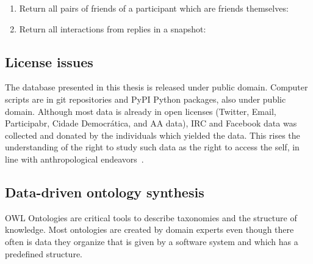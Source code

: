 \begin{enumerate}[leftmargin=0cm]
\item Return all pairs of friends of a participant which are friends themselves:\\
\item Return all interactions from replies in a snapshot:\\
\end{enumerate}

\subsection{License issues}
The database presented in this thesis is released under public domain.
Computer scripts are in git repositories and PyPI Python packages, also under public domain.
Although most data is already in open licenses (Twitter, Email, Participabr, Cidade Democrática, and AA data), IRC and Facebook data was collected
and donated by the individuals which yielded the data.
This rises the understanding of the right to study such data as the right to access the self,
in line with anthropological endeavors~\cite{antphy,antphy2}.


\subsection{Data-driven ontology synthesis}\label{sec:ontSyn}
OWL Ontologies are critical tools to describe taxonomies and the
structure of knowledge.
Most ontologies are created by domain experts even though there often is data they
organize that is given by a software system and which has a predefined
structure. 


